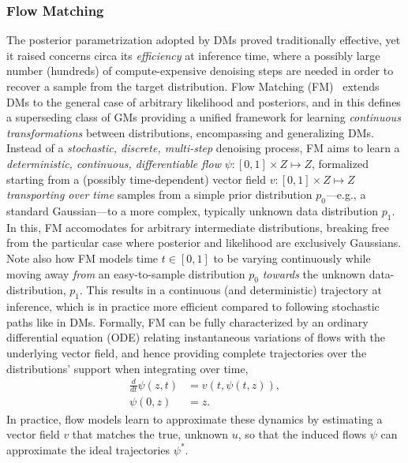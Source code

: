 \subsubsection{Flow Matching}
\label{sec:ch4-flow-matching}
 
The posterior parametrization adopted by DMs proved traditionally effective, yet it raised concerns circa its \emph{efficiency} at inference time, where a possibly large number (hundreds) of compute-expensive denoising steps are needed in order to recover a sample from the target distribution.
Flow Matching (FM)~\citep{lipmanFlowMatchingGenerative2023} extends DMs to the general case of arbitrary likelihood and posteriors, and in this defines a superseding class of GMs providing a unified framework for learning \emph{continuous transformations} between distributions, encompassing and generalizing DMs.
Instead of a \emph{stochastic, discrete, multi-step} denoising process, FM aims to learn a \emph{deterministic, continuous, differentiable flow} \( \psi: [0,1] \times Z \mapsto Z \), formalized starting from a (possibly time-dependent) vector field \( v: [0,1] \times Z \mapsto Z \) \emph{transporting over time} samples from a simple prior distribution \( p_0 \)---e.g., a standard Gaussian---to a more complex, typically unknown data distribution \( p_1 \).
In this, FM accomodates for arbitrary intermediate distributions, breaking free from the particular case where posterior and likelihood are exclusively Gaussians.
Note also how FM models time \( t \in [0,1] \) to be varying continuously while moving away \emph{from} an easy-to-sample distribution \( p_0 \) \emph{towards} the unknown data-distribution, \( p_1 \).
This results in a continuous (and deterministic) trajectory at inference, which is in practice more efficient compared to following stochastic paths like in DMs.
Formally, FM can be fully characterized by an ordinary differential equation (ODE) relating instantaneous variations of flows with the underlying vector field, and hence providing complete trajectories over the distributions' support when integrating over time,
\begin{align}
    \frac{d}{dt} \psi(z, t) &= v(t, \psi(t, z)), \\
    \psi(0, z) &= z .
\end{align}
In practice, flow models learn to approximate these dynamics by estimating a vector field \( v \) that matches the true, unknown \( u \), so that the induced flows \( \psi \) can approximate the ideal trajectories \( \psi^* \).

